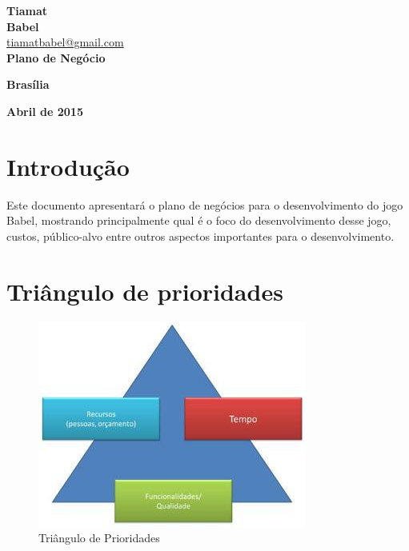 \documentclass[11pt]{article} %
\begin{document}
\begin{titlepage}
 \vfill
  \begin{center}
   {\large \textbf{Tiamat}} \\
   {\large \textbf{Babel}}\\
   {\large \url{tiamatbabel@gmail.com}}\\[6cm]


   {\Large \textbf{Plano de Negócio}}\\

   \hspace{.45\textwidth} %
  \vfill

\vspace{2cm}

\large \textbf{Brasília}

\large \textbf{Abril de 2015}
\end{center}
\end{titlepage}
\newpage

\tableofcontents

\newpage


\section{Introdução}

Este documento apresentará o plano de negócios para o desenvolvimento do jogo Babel, mostrando principalmente qual é o foco do desenvolvimento desse jogo, custos, público-alvo entre outros aspectos importantes para o desenvolvimento.

\section{Triângulo de prioridades}

\begin{figure}[!htp]
\centering
\includegraphics[scale=0.75]{pictures/restrictions_triangle.jpg}
\caption{Triângulo de Prioridades}
\label{Prioridades}
\end{figure}
\end{document}
